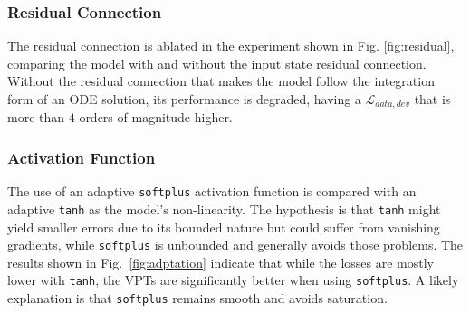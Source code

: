 \documentclass[conference]{IEEEtran}
\begin{document}
{\subsubsection{Residual Connection}
The residual connection is ablated in the experiment shown in Fig. \ref{fig:residual}, comparing the model with and without the input state residual connection. Without the residual connection that makes the model follow the integration form of an ODE solution, its performance is degraded, having a $\mathcal{L}_{data,dev}$ that is more than $4$ orders of magnitude higher. 
%


%
\subsubsection{Activation Function}
The use of an adaptive \lstinline|softplus| activation function is compared with an adaptive \lstinline|tanh| as the model's non-linearity. The hypothesis is that \lstinline|tanh| might yield smaller errors due to its bounded nature but could suffer from vanishing gradients, while \lstinline|softplus| is unbounded and generally avoids those problems.
%
The results shown in Fig.~\ref{fig:adptation} indicate that while the losses are mostly lower with \lstinline|tanh|, the VPTs are significantly better when using \lstinline|softplus|. A likely explanation is that \lstinline|softplus| remains smooth and avoids saturation. 


%


}
\end{document}
